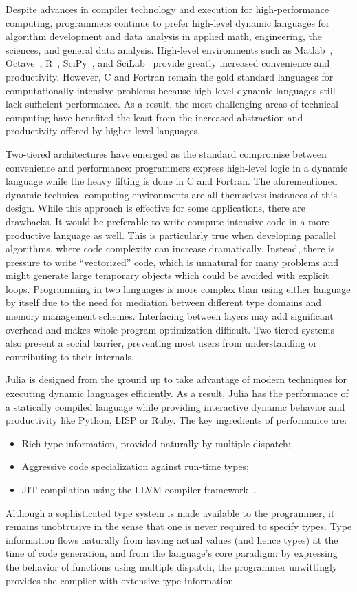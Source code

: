 \documentclass[conference]{IEEEtran}
\begin{document}
Despite advances in compiler technology and execution for
high-performance computing, programmers continue to prefer high-level
dynamic languages for algorithm development and data analysis in
applied math, engineering,  the sciences, and general data analysis. High-level environments
such as Matlab~\cite{matlab}, Octave~\cite{Octave}, R~\cite{Rlang},
SciPy~\cite{numpy}, and SciLab~\cite{scilab} provide greatly increased
convenience and productivity. However, C and Fortran remain the gold
standard languages for computationally-intensive problems because
high-level dynamic languages still lack sufficient performance. As a
result, the most challenging areas of technical computing have
benefited the least from the increased abstraction and productivity
offered by higher level languages.

Two-tiered architectures have emerged as the standard compromise between
convenience and performance: programmers express high-level logic in a
dynamic language while the heavy lifting is done in C and Fortran. The
aforementioned dynamic technical computing environments are all themselves
instances of this design. While this approach is effective for some
applications, there are drawbacks. It would be preferable to write
compute-intensive code in a more productive language as well. This is
particularly true when developing parallel algorithms, where code
complexity can increase dramatically. Instead, there is pressure to write
``vectorized'' code, which is unnatural for many problems and might
generate large temporary objects which could be avoided with explicit
loops. Programming in two languages is more complex than using either
language by itself due to the need for mediation between different type
domains and memory management schemes. Interfacing between layers may add
significant overhead and makes whole-program optimization difficult.
Two-tiered systems also present a social barrier, preventing most users
from understanding or contributing to their internals.

Julia is designed from the ground up to take advantage of modern
techniques for executing dynamic languages efficiently. As a result, Julia
has the performance of a statically compiled language while providing
interactive dynamic behavior and productivity like Python, LISP or Ruby.
The key ingredients of performance are:
\begin{itemize}
\item Rich type information, provided naturally by multiple dispatch;
\item Aggressive code specialization against run-time types;
\item JIT compilation using the LLVM compiler framework~\cite{LLVM}.
\end{itemize}
Although a sophisticated type system is made available to the programmer,
it remains unobtrusive in the sense that one is never required to specify
types. Type information flows naturally from having actual values (and
hence types) at the time of code generation, and from the language's core
paradigm: by expressing the behavior of functions using multiple dispatch,
the programmer unwittingly provides the compiler with extensive type
information.
\end{document}
